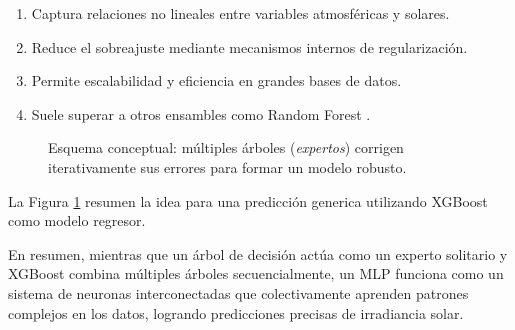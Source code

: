 \begin{enumerate}
\item Captura relaciones no lineales entre variables atmosféricas y solares.
\item Reduce el sobreajuste mediante mecanismos internos de regularización.
\item Permite escalabilidad y eficiencia en grandes bases de datos.
\item Suele superar a otros ensambles como Random Forest \cite{espinoza2020aplicacion}.
\end{enumerate}

\begin{figure}[H] 
\centering 
{} \caption{Esquema conceptual: múltiples árboles (\textit{expertos}) corrigen iterativamente sus errores para formar un modelo robusto.} \label{fig:esquemaxgb} \end{figure}


La Figura \ref{fig:esquemaxgb} resumen la idea para una predicción generica utilizando XGBoost como modelo regresor.


En resumen, mientras que un árbol de decisión actúa como un experto solitario y XGBoost combina múltiples árboles secuencialmente, un MLP funciona como un sistema de neuronas interconectadas que colectivamente aprenden patrones complejos en los datos, logrando predicciones precisas de irradiancia solar.



